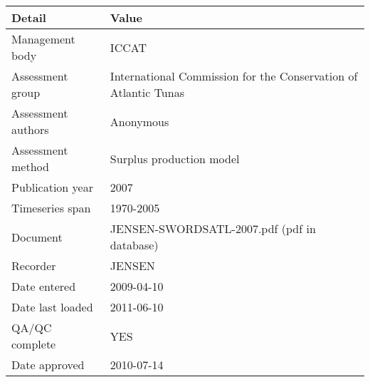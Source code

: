 \begin{table}[htb]
\centering
\begin{tabular}{lp{7cm}}
\toprule
Detail & Value \\
\midrule
Management body    & ICCAT                                                           \\
Assessment group   & International Commission for the Conservation of Atlantic Tunas \\
Assessment authors & Anonymous                                                       \\
Assessment method  & Surplus production model                                        \\
Publication year   & 2007                                                            \\
Timeseries span    & 1970-2005                                                       \\
Document           & JENSEN-SWORDSATL-2007.pdf (pdf in database)                     \\
Recorder           & JENSEN                                                          \\
Date entered       & 2009-04-10                                                      \\
Date last loaded   & 2011-06-10                                                      \\
QA/QC complete     & YES                                                             \\
Date approved      & 2010-07-14                                                      \\
\bottomrule
\end{tabular}
\label{tab:assessdet}
\end{table}
